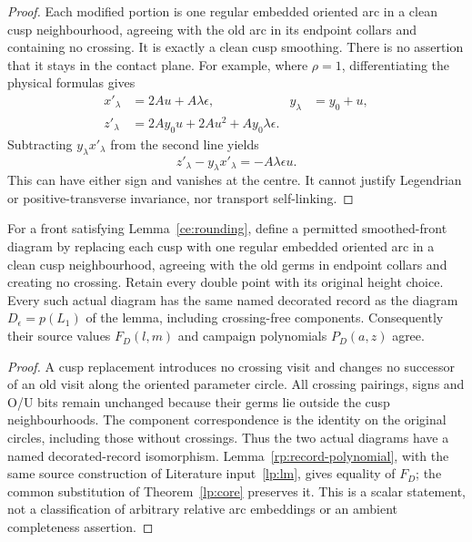 \begin{proof}
Each modified portion is one regular embedded oriented arc in a clean
cusp neighbourhood, agreeing with the old arc in its endpoint collars
and containing no crossing. It is exactly a clean cusp smoothing.
There is no assertion that it stays in the contact plane. For example,
where $\rho=1$, differentiating the physical formulas gives
\begin{align}
 x'_\lambda&=2Au+A\lambda\epsilon,
 &y_\lambda&=y_0+u,\label{ce:contact-derivatives}\\
 z'_\lambda&=2Ay_0u+2Au^2+Ay_0\lambda\epsilon.
 \label{ce:contact-z-derivative}
\end{align}
Subtracting $y_\lambda x'_\lambda$ from the second line yields
\begin{equation}\label{ce:ordinary-not-contact}
 z'_\lambda-y_\lambda x'_\lambda=-A\lambda\epsilon u.
\end{equation}
This can have either sign and vanishes at the centre. It cannot justify
Legendrian or positive-transverse invariance, nor transport self-linking.
\end{proof}

\begin{corollary}
\label{ce:smoothing-record}
For a front satisfying Lemma~\ref{ce:rounding}, define a permitted
smoothed-front diagram by replacing each cusp with one regular embedded
oriented arc in a clean cusp neighbourhood, agreeing with the old germs
in endpoint collars and creating no crossing. Retain every double point
with its original height choice. Every such actual diagram has the same
named decorated record as the diagram $D_\epsilon=p(L_1)$ of the lemma,
including crossing-free components. Consequently their source values
$F_D(l,m)$ and campaign polynomials $P_D(a,z)$ agree.
\end{corollary}
\begin{proof}
A cusp replacement introduces no crossing visit and changes no successor
of an old visit along the oriented parameter circle. All crossing
pairings, signs and O/U bits remain unchanged because their germs lie
outside the cusp neighbourhoods. The component correspondence is the
identity on the original circles, including those without crossings.
Thus the two actual diagrams have a named decorated-record isomorphism.
Lemma~\ref{rp:record-polynomial}, with the same source construction of
Literature input~\ref{lp:lm}, gives equality of $F_D$; the common substitution
of Theorem~\ref{lp:core} preserves it. This is a scalar statement, not
a classification of arbitrary relative arc embeddings or an ambient
completeness assertion.
\end{proof}

